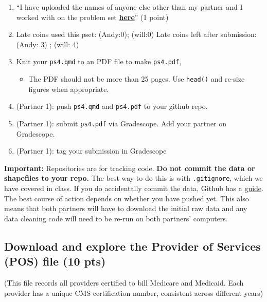 \documentclass[
  letterpaper,
  DIV=11,
  numbers=noendperiod]{scrartcl}
\providecommand{\tightlist}{%
  \setlength{\itemsep}{0pt}\setlength{\parskip}{0pt}}\usepackage{longtable,booktabs,array}
\begin{document}
\begin{enumerate}
\def\labelenumi{\arabic{enumi}.}
\setcounter{enumi}{4}
\tightlist
\item
  ``I have uploaded the names of anyone else other than my partner and I
  worked with on the problem set
  \textbf{\href{https://docs.google.com/forms/d/185usrCREQaUbvAXpWhChkjghdGgmAZXA3lPWpXLLsts/edit}{here}}''
  (1 point)
\item
  Late coins used this pset: (Andy:0); (will:0) Late coins left after
  submission: (Andy: 3) ; (will: 4)
\item
  Knit your \texttt{ps4.qmd} to an PDF file to make \texttt{ps4.pdf},

  \begin{itemize}
  \tightlist
  \item
    The PDF should not be more than 25 pages. Use \texttt{head()} and
    re-size figures when appropriate.
  \end{itemize}
\item
  (Partner 1): push \texttt{ps4.qmd} and \texttt{ps4.pdf} to your github
  repo.
\item
  (Partner 1): submit \texttt{ps4.pdf} via Gradescope. Add your partner
  on Gradescope.
\item
  (Partner 1): tag your submission in Gradescope
\end{enumerate}

\textbf{Important:} Repositories are for tracking code. \textbf{Do not
commit the data or shapefiles to your repo.} The best way to do this is
with \texttt{.gitignore}, which we have covered in class. If you do
accidentally commit the data, Github has a
\href{https://docs.github.com/en/repositories/working-with-files/managing-large-files/about-large-files-on-github\#removing-files-from-a-repositorys-history}{guide}.
The best course of action depends on whether you have pushed yet. This
also means that both partners will have to download the initial raw data
and any data cleaning code will need to be re-run on both partners'
computers.

\subsection{Download and explore the Provider of Services (POS) file (10
pts)}\label{download-and-explore-the-provider-of-services-pos-file-10-pts}

(This file records all providers certified to bill Medicare and
Medicaid. Each provider has a unique CMS certification number,
consistent across different years)
\end{document}
